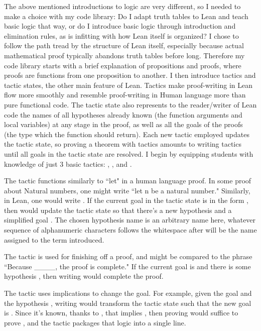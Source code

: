 The above mentioned introductions to logic are very different, so I needed
to make a choice with my code library: Do I adapt truth tables to
Lean and teach basic logic that way, or do I introduce basic logic through
introduction and elimination rules, as is infitting with how Lean itself 
is organized? I chose to follow the path tread by the structure of Lean itself,
especially because actual mathematical proof typically abandons truth tables
before long. Therefore my code library starts with a brief explanation of
propositions and proofs, where proofs are functions from one proposition to
another. I then introduce tactics and tactic states, the other main feature
of Lean. Tactics make proof-writing in Lean flow more smoothly and resemble 
proof-writing in Human language more than pure functional code. The tactic
state also represents to the reader/writer of Lean code the names of all
hypotheses already known (the function arguments and local variables) at any stage in the proof, as 
well as all the goals of the proofs (the type which the function should return).
Each new tactic employed updates the tactic state, so proving a theorem with
tactics amounts to writing tactics until all goals in the tactic state are resolved. 
I begin by equipping students with knowledge of 
just 3 basic tactics: , , and .

The  tactic functions similarly to ``let" in a human language proof. 
In some proof about Natural numbers, one might write ``let n be a natural number."
Similarly, in Lean, one would write .
If the current goal in the tactic state is in the form , then
 would update the tactic state so that there's a new hypothesis
 and a simplified goal . The chosen hypothesis name  is an arbitrary name here, whatever
sequence of alphanumeric characters follows the whitespace after  will
be the name assigned to the term introduced. 

The  tactic is used for finishing off a proof, and might be compared
to the phrase ``Because \_\_\_\_, the proof is complete." If the current goal is
 and there is some hypothesis , 
then writing  would complete the proof.

The  tactic uses implications to change the goal. For example, 
given the goal  and the hypothesis , writing
 would transform the tactic state such that the new goal
is . Since it's known, thanks to , that  implies , 
then proving  would suffice to prove , and the 
tactic packages that logic into a single line.

